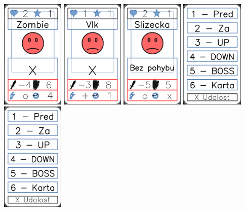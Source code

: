 \documentclass[a4paper]{article}
\begin{document}
	\includegraphics[width=3.0cm]{img-7_1}
	\includegraphics[width=3.0cm]{img-7_2}
	\includegraphics[width=3.0cm]{img-7_3}
	\includegraphics[width=3.0cm]{img-7_4}
	\includegraphics[width=3.0cm]{img-7_5}
\end{document}

